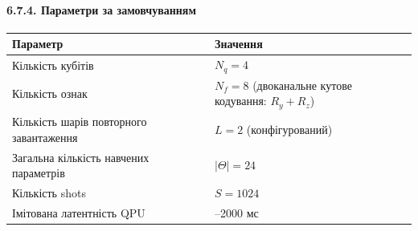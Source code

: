 \documentclass[12pt,a4paper]{article}
\begin{document}
\paragraph{6.7.4. Параметри за замовчуванням}\label{ux43fux430ux440ux430ux43cux435ux442ux440ux438-ux437ux430-ux437ux430ux43cux43eux432ux447ux443ux432ux430ux43dux43dux44fux43c}



{\def\LTcaptype{none} %

\begin{longtable}[]{@{}

  >{\raggedright\arraybackslash}p{0.5000\linewidth}

  >{\raggedright\arraybackslash}p{0.5000\linewidth}@{}}

\toprule\noalign{}

\begin{minipage}[b]{\linewidth}\raggedright

Параметр

\end{minipage} & \begin{minipage}[b]{\linewidth}\raggedright

Значення

\end{minipage} \\

\midrule\noalign{}

\endhead

\bottomrule\noalign{}

\endlastfoot

Кількість кубітів & \(N_q = 4\) \\

Кількість ознак & \(N_f = 8\) (двоканальне кутове кодування: \(R_y + R_z\)) \\

Кількість шарів повторного завантаження & \(L = 2\) (конфігурований) \\

Загальна кількість навчених параметрів & \(|\Theta| = 24\) \\

Кількість shots & \(S = 1024\) \\

Імітована латентність QPU & 300--2000 мс \\

\end{longtable}

}
\end{document}
